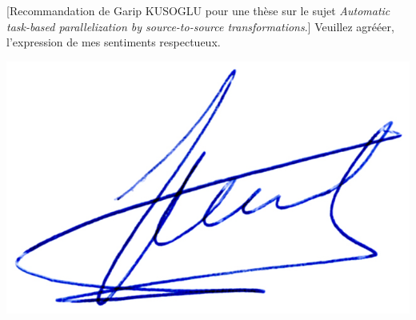 \documentclass[a4paper,10pt]{article}
\begin{document}
\begin{letter}[Recommandation de Garip \textsc{KUSOGLU} pour une thèse sur le
  sujet \textit{Automatic task-based parallelization by source-to-source transformations}.]
  Veuillez agrééer, l'expression de mes sentiments respectueux.

\begin{flushright}
\includegraphics[width=.25\textwidth]{signgenaud.jpg} 
\end{flushright}

\end{letter}
\end{document}
